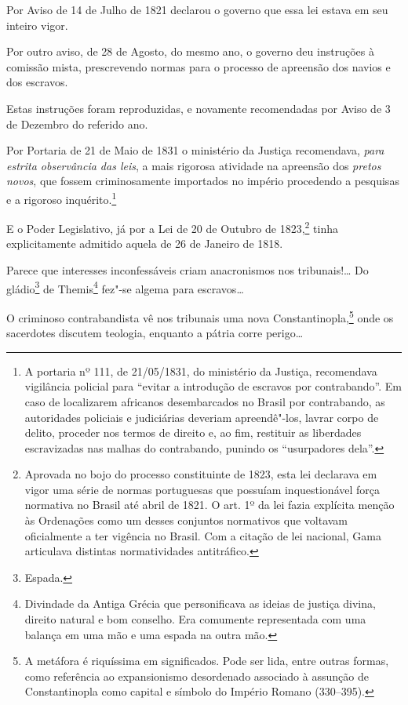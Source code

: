 Por Aviso de 14 de Julho de 1821 declarou o governo que essa lei estava
em seu inteiro vigor.

Por outro aviso, de 28 de Agosto, do mesmo ano, o governo deu instruções
à comissão mista, prescrevendo normas para o processo de apreensão dos
navios e dos escravos.

Estas instruções foram reproduzidas, e novamente recomendadas por Aviso
de 3 de Dezembro do referido ano.

Por Portaria de 21 de Maio de 1831 o ministério da Justiça recomendava,
\emph{para estrita observância das leis}, a mais rigorosa atividade na
apreensão dos \emph{pretos novos}, que fossem criminosamente importados
no império procedendo a pesquisas e a rigoroso inquérito.\footnote{A
  portaria nº 111, de 21/05/1831, do ministério da Justiça, recomendava
  vigilância policial para ``evitar a introdução de escravos por
  contrabando''. Em caso de localizarem africanos desembarcados no Brasil
  por contrabando, as autoridades policiais e judiciárias deveriam
  apreendê"-los, lavrar corpo de delito, proceder nos termos de
  direito e, ao fim, restituir as liberdades escravizadas nas malhas
  do contrabando, punindo os ``usurpadores dela''.}

E o Poder Legislativo, já por a Lei de 20 de Outubro de 1823,\footnote{
  Aprovada no bojo do processo constituinte de 1823, esta lei declarava
  em vigor uma série de normas portuguesas que possuíam inquestionável
  força normativa no Brasil até abril de 1821. O art. 1º da lei fazia
  explícita menção às Ordenações como um desses conjuntos normativos que
  voltavam oficialmente a ter vigência no Brasil. Com a citação de lei
  nacional, Gama articulava distintas normatividades
  antitráfico.} tinha
explicitamente admitido aquela de 26 de Janeiro de 1818.

Parece que interesses inconfessáveis criam anacronismos nos
tribunais!\ldots{} Do gládio\footnote{Espada.} de Themis\footnote{
  Divindade da Antiga Grécia que personificava as ideias de justiça
  divina, direito natural e bom conselho. Era comumente representada com
  uma balança em uma mão e uma espada na outra mão.} fez"-se algema para
escravos\ldots{}

O criminoso contrabandista vê nos tribunais uma nova Constantinopla,\footnote{A metáfora é riquíssima em significados. Pode ser lida,
  entre outras formas, como referência ao expansionismo desordenado
  associado à assunção de Constantinopla como capital e símbolo do
  Império Romano (330--395).} onde os sacerdotes discutem teologia,
enquanto a pátria corre perigo\ldots{}

